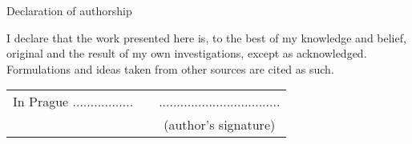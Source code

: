 \newcommand{\odsaditodzhora}{\hskip1pt\vfill}

\odsaditodzhora
\noindent Declaration of authorship


I declare that the work presented here is, to the best of my knowledge and belief,
original and the result of my own investigations, except as acknowledged.
Formulations and ideas taken from other sources are cited as such.

\begin{flushleft}
\begin{tabular}{cp{}c}
In Prague ................. %
&
&
..................................
\\
&&
(author's signature)
\end{tabular}

\end{flushleft}

